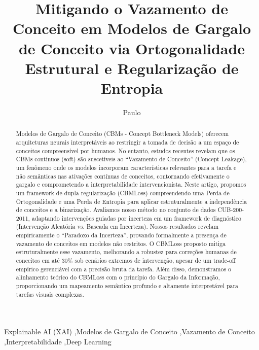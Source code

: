 \documentclass[times,twocolumn,final]{elsarticle}
\newif\ifanonymous
\begin{document}

\begin{frontmatter}

\title{Mitigando o Vazamento de Conceito em Modelos de Gargalo de Conceito via Ortogonalidade Estrutural e Regularização de Entropia}

\ifanonymous
  \author[1]{XXXXXX}
  \emailauthor{XXXXXX}{XXXXXX}
  \address[1]{XXXXXX}
\else
  \author[1]{Paulo }
      
  \address[1]{Instituto Federal de Mato Grosso (IFMT), Brazil}
\fi

\received{\today}

\begin{abstract}
Modelos de Gargalo de Conceito (CBMs - Concept Bottleneck Models) oferecem arquiteturas neurais interpretáveis ao restringir a tomada de decisão a um espaço de conceitos compreensível por humanos. No entanto, estudos recentes revelam que os CBMs contínuos (soft) são suscetíveis ao ``Vazamento de Conceito'' (Concept Leakage), um fenômeno onde os modelos incorporam características relevantes para a tarefa e não semânticas nas ativações contínuas de conceitos, contornando efetivamente o gargalo e comprometendo a interpretabilidade intervencionista. Neste artigo, propomos um framework de dupla regularização (CBMLoss) compreendendo uma Perda de Ortogonalidade e uma Perda de Entropia para aplicar estruturalmente a independência de conceitos e a binarização. Avaliamos nosso método no conjunto de dados CUB-200-2011, adaptando intervenções guiadas por incerteza em um framework de diagnóstico (Intervenção Aleatória vs. Baseada em Incerteza). Nossos resultados revelam empiricamente o ``Paradoxo da Incerteza'', provando formalmente a presença de vazamento de conceitos em modelos não restritos. O CBMLoss proposto mitiga estruturalmente esse vazamento, melhorando a robustez para correções humanas de conceitos em até 30\% sob cenários extremos de intervenção, apesar de um trade-off empírico gerenciável com a precisão bruta da tarefa. Além disso, demonstramos o alinhamento teórico do CBMLoss com o princípio do Gargalo da Informação, proporcionando um mapeamento semântico profundo e altamente interpretável para tarefas visuais complexas.
\end{abstract}

\begin{keyword}
Explainable AI (XAI) \sep Modelos de Gargalo de Conceito \sep Vazamento de Conceito \sep Interpretabilidade \sep Deep Learning
\end{keyword}

\end{frontmatter}
\end{document}
